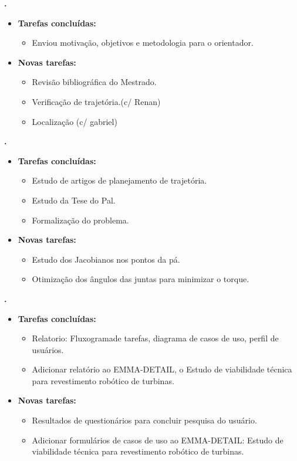 	
	  \textbf{\elael.} 
	\begin{itemize}
		\item \textbf{Tarefas concluídas:}
			\begin{itemize}    
				\item Enviou motivação, objetivos e metodologia para o orientador.
			\end{itemize}
		
		\item \textbf{Novas tarefas:}
			\begin{itemize} 
			    \item Revisão bibliográfica do Mestrado.
			    \item Verificação de trajetória.(c/ Renan)
			    \item Localização (c/ gabriel)
			\end{itemize}
	\end{itemize}			
			
  \textbf{\renan.} 
	\begin{itemize}
		\item \textbf{Tarefas concluídas:}
			\begin{itemize}    
				\item Estudo de artigos de planejamento de trajetória.
				\item Estudo da Tese do Pal.
				\item Formalização do problema.
			\end{itemize}
		
		\item \textbf{Novas tarefas:}
			\begin{itemize} 
			    \item Estudo dos Jacobianos nos pontos da pá.
			    \item Otimização dos ângulos das juntas para minimizar o torque.
			\end{itemize}
	\end{itemize}	
			
   \textbf{\julia.} 
	\begin{itemize}
		\item \textbf{Tarefas concluídas:}
			\begin{itemize}    
				\item Relatorio: Fluxogramade tarefas, diagrama de casos de uso, perfil de
				usuários.
				\item Adicionar relatório ao EMMA-DETAIL, o Estudo de viabilidade técnica
				para revestimento robótico de turbinas.
			\end{itemize}
		
		\item \textbf{Novas tarefas:}
			\begin{itemize} 
			    \item Resultados de questionários para concluir pesquisa do usuário.
			    \item Adicionar formulários de casos de uso ao EMMA-DETAIL: Estudo de
			    viabilidade técnica para revestimento robótico de turbinas.
			\end{itemize}
	\end{itemize}		



